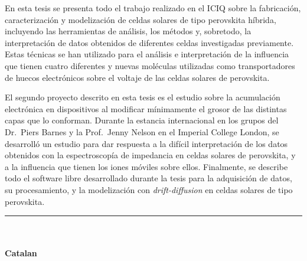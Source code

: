 En esta tesis se presenta todo el trabajo realizado en el ICIQ sobre la fabricación, caracterización y modelización de celdas solares de tipo perovskita híbrida, incluyendo las herramientas de análisis, los métodos y, sobretodo, la interpretación de datos obtenidos de diferentes celdas investigadas previamente.
Estas técnicas se han utilizado para el análisis e interpretación
de la influencia que tienen cuatro diferentes y nuevas moléculas
utilizadas como transportadores de huecos electrónicos sobre el voltaje
de las celdas solares de perovskita.

El segundo proyecto descrito en esta tesis es el estudio sobre la acumulación electrónica en dispositivos al modificar mínimamente el grosor de las distintas capas que lo conforman.
Durante la estancia internacional en los grupos del Dr.\ Piers Barnes y la Prof.\ Jenny Nelson en el Imperial College London, se desarrolló un estudio para dar respuesta a la difícil interpretación de los datos obtenidos con la espectroscopía de impedancia en celdas solares de perovskita, y a la influencia que tienen los iones móviles sobre ellos.
Finalmente, se describe todo el software libre desarrollado durante la tesis para la adquisición de datos, su procesamiento, y la modelización con \textsl{drift\hyp{}diffusion} en celdas solares de tipo perovskita.


	{
		\vfill
		\centering \rule{5cm}{1pt}\\
		\vfill
	}

\EnableQuotes
\noindent

\paragraph{Catalan}

